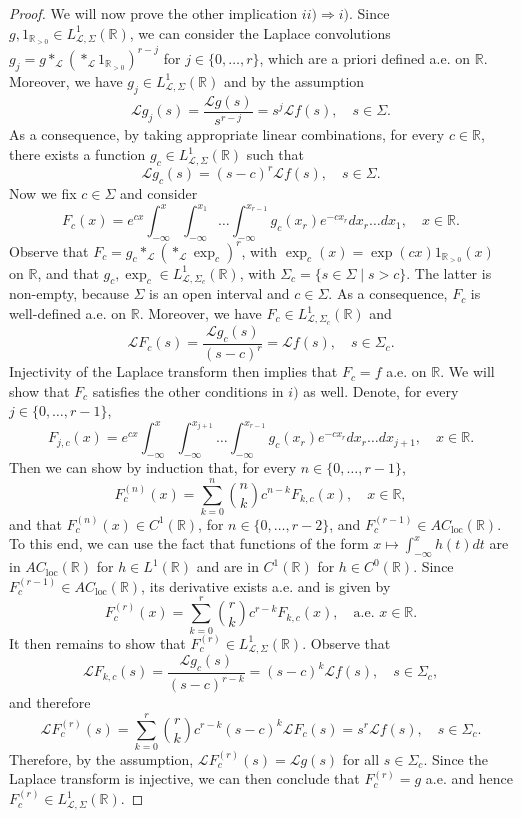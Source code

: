 \documentclass[a4paper,12pt,oneside]{article}
\theoremstyle{definition}
\newcommand{\R}{\mathbb{R}}
\newcommand{\im}{\Rightarrow}
\newcommand{\LT}[1]{\mathcal{L}#1}
\begin{document}
\begin{proof}
    We will now prove the other implication $ii)\im i)$. Since $g,1_{\R_{>0}}\in L_{\LT{},\Sigma}^{1}(\R)$, we can consider the Laplace convolutions $g_j = g \ast_{\LT{}} (\ast_{\LT{}} 1_{\R_{>0}})^{r-j}$ for $j\in\{0,\dots,r\}$, which are a priori defined a.e. on $\R$. Moreover, we have $g_j\in L_{\LT{},\Sigma}^{1}(\R)$ and by the assumption
        $$\LT{g_j}(s) = \frac{\LT{g}(s)}{s^{r-j}} = s^{j} \LT{f}(s),\quad s\in\Sigma. $$
    As a consequence, by taking appropriate linear combinations, for every $c\in\R$, there exists a function $g_c\in L_{\LT{},\Sigma}^{1}(\R)$ such that
        $$\LT{g_c}(s) = (s-c)^r \LT{f}(s),\quad s\in\Sigma.$$
    Now we fix $c\in\Sigma$ and consider
        $$ F_c(x) = e^{cx} \int_{-\infty}^{x} \int_{-\infty}^{x_1} \dots \int_{-\infty}^{x_{r-1}} g_c(x_r) e^{-cx_r} dx_r\dots dx_1,\quad x\in\R. $$
    Observe that $F_c = g_c \ast_{\LT{}} (\ast_{\LT{}} \exp_c )^r$, with $\exp_c(x)=\exp(cx) 1_{\R_{>0}}(x)$ on $\R$, and that $g_c,\exp_c\in L_{\LT{},\Sigma_c}^{1}(\R)$, with $\Sigma_c = \{s\in\Sigma \mid s>c\}$. The latter is non-empty, because $\Sigma$ is an open interval and $c\in\Sigma$. As a consequence, $F_c$ is well-defined a.e. on $\R$. Moreover, we have $F_c\in L_{\LT{},\Sigma_c}^{1}(\R)$ and 
        $$ \LT{F_c}(s) = \frac{\LT{g}_c(s)}{(s-c)^r} = \LT{f}(s),\quad s\in\Sigma_c. $$     
    Injectivity of the Laplace transform then implies that $F_c=f$ a.e. on $\R$. We will show that $F_c$ satisfies the other conditions in $i)$ as well. Denote, for every $j\in\{0,\dots,r-1\}$,
        $$ F_{j,c}(x) = e^{cx} \int_{-\infty}^{x} \int_{-\infty}^{x_{j+1}} \dots \int_{-\infty}^{x_{r-1}} g_c(x_r) e^{-cx_r} dx_r\dots dx_{j+1},\quad x\in\R. $$
    Then we can show by induction that, for every $n\in\{0,\dots,r-1\}$,
        $$ F_{c}^{(n)}(x) = \sum_{k=0}^{n} \binom{n}{k} c^{n-k} F_{k,c}(x),\quad x\in\R, $$
    and that $F_{c}^{(n)}(x)\in C^1(\R)$, for $n\in\{0,\dots,r-2\}$, and $F_{c}^{(r-1)}\in AC_{\text{loc}}(\R)$. To this end, we can use the fact that functions of the form $x\mapsto \int_{-\infty}^x h(t) dt$ are in $AC_{\text{loc}}(\R)$ for $h\in L^{1}(\R)$ and are in $C^{1}(\R)$ for $h\in C^{0}(\R)$. Since $F_{c}^{(r-1)}\in AC_{\text{loc}}(\R)$, its derivative exists a.e. and is given by
        $$ F_{c}^{(r)}(x) = \sum_{k=0}^{r} \binom{r}{k} c^{r-k} F_{k,c}(x),\quad \text{a.e. } x\in\R. $$
    It then remains to show that $F_c^{(r)}\in L_{\LT{},\Sigma}^{1}(\R)$. Observe that
        $$\LT{F_{k,c}}(s) = \frac{\LT{g_c}(s)}{(s-c)^{r-k}} = (s-c)^k \LT{f}(s),\quad s\in\Sigma_c,$$
    and therefore
        $$ \LT{F_c^{(r)}}(s) =  \sum_{k=0}^{r} \binom{r}{k} c^{r-k} (s-c)^k \LT{F_c}(s) = s^{r} \LT{f}(s),\quad s\in\Sigma_c. $$
    Therefore, by the assumption, $\LT{F_c^{(r)}}(s) = \LT{g}(s)$ for all $s\in\Sigma_c$. Since the Laplace transform is injective, we can then conclude that $F_c^{(r)} = g$ a.e. and hence $F_c^{(r)}\in L_{\LT{},\Sigma}^{1}(\R)$.    
\end{proof}
\end{document}
